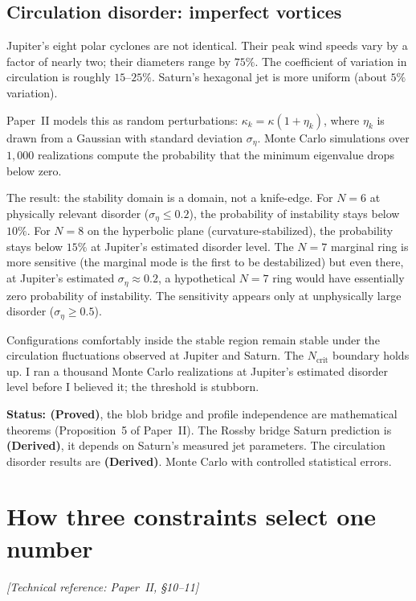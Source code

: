 \subsection*{Circulation disorder: imperfect vortices}

Jupiter's eight polar cyclones are not identical. Their peak wind speeds
vary by a factor of nearly two; their diameters range by $75\%$. The
coefficient of variation in circulation is roughly $15$--$25\%$.
Saturn's hexagonal jet is more uniform (about $5\%$ variation).

Paper~II models this as random perturbations:
$\kappa_k = \kappa(1 + \eta_k)$, where $\eta_k$ is drawn from a
Gaussian with standard deviation $\sigma_\eta$. Monte Carlo
simulations over $1{,}000$ realizations compute the probability that
the minimum eigenvalue drops below zero.

The result: the stability domain is a domain, not a knife-edge.
For $N = 6$ at physically relevant disorder ($\sigma_\eta \le 0.2$),
the probability of instability stays below $10\%$. For $N = 8$ on the
hyperbolic plane (curvature-stabilized), the probability stays below
$15\%$ at Jupiter's estimated disorder level. The $N = 7$ marginal ring
is more sensitive (the marginal mode is the first to be destabilized) 
but even there, at Jupiter's estimated $\sigma_\eta \approx 0.2$, a
hypothetical $N = 7$ ring would have essentially zero probability of
instability. The sensitivity appears only at unphysically large
disorder ($\sigma_\eta \ge 0.5$).

Configurations comfortably inside the stable region remain stable under
the circulation fluctuations observed at Jupiter and Saturn. The
$N_{\mathrm{crit}}$ boundary holds up. I ran a thousand Monte Carlo
realizations at Jupiter's estimated disorder level before I believed
it; the threshold is stubborn.

\textbf{Status: (Proved)}, the blob bridge and profile independence are
mathematical theorems (Proposition~5 of Paper~II). The Rossby bridge
Saturn prediction is \textbf{(Derived)}, it depends on Saturn's
measured jet parameters. The circulation disorder results are
\textbf{(Derived)}. Monte Carlo with controlled statistical errors.


\section{How three constraints select one number}
\noindent\textit{[Technical reference: Paper~II, \S10--11]}

